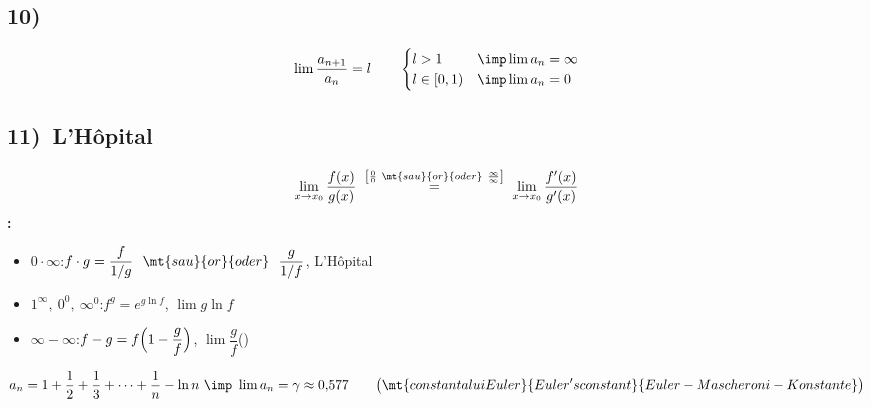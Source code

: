 \subsection{10)\ }
\[
\lim\frac{a_{n+1}}{a_n}=l\qquad\begin{cases}l>1&\imp\lim a_n=\infty\\ l\in[0,1)&\imp\lim a_n=0\end{cases}
\]

\subsection{11)\ L'H\^opital}
\[
\lim_{x\to x_0}\frac{f(x)}{g(x)}\ \overset{\left[\frac00\ \mt{sau}{or}{oder}\ \frac\infty\infty\right]}{=}\ \lim_{x\to x_0}\frac{f'(x)}{g'(x)}
\]
\textbf{:}
\begin{itemize}[label=$\bullet$]
\item $0\cdot\infty$:\quad $f\cdot g=\dfrac{f}{1/g}\ \ \mt{sau}{or}{oder}\ \ \dfrac{g}{1/f}$,\quad {} L'H\^opital
\item $1^\infty,\ 0^0,\ \infty^0$:\quad $f^g=e^{g\ln f}$,\quad {} $\lim g\ln f$
\item $\infty-\infty$:\quad $f-g=f\Bigl(1-\dfrac gf\Bigr)$,\quad {} $\lim\dfrac gf$\quad()
\end{itemize}
\begin{important}
\[
a_n=1+\frac12+\frac13+\dots+\frac1n-\ln n\ \imp\ \lim a_n=\gamma\approx0{,}577\qquad
\bigl(\mt{constanta lui Euler}{Euler's constant}{Euler-Mascheroni-Konstante}\bigr)
\]
\end{important}

